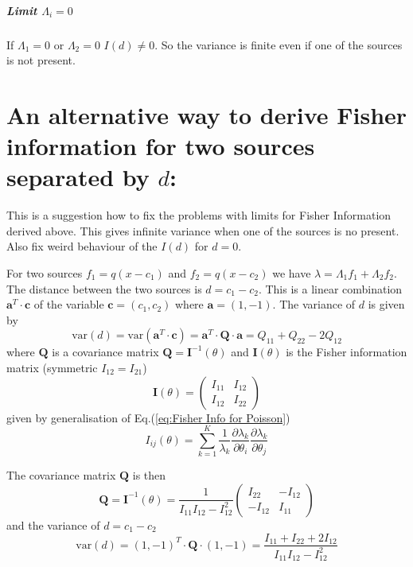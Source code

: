 \subparagraph{Limit $\Lambda_{i}=0$}

If $\Lambda_{1}=0$ or $\Lambda_{2}=0$ $I(d)\neq0$. So the variance is finite even if one of the sources is not present.


\section{An alternative way to derive Fisher information for two sources separated by $d$:\label{sub:Appendix An-alternative-way-Fisher-info}}

This is a suggestion how to fix the problems with limits for Fisher Information derived above. This gives infinite variance when one of the sources is no present. Also fix weird behaviour of the $I(d)$ for $d=0$. 

For two sources $f_{1}=q(x-c_{1})$ and $f_{2}=q(x-c_{2})$ we have $\lambda=\Lambda_{1}f_{1}+\Lambda_{2}f_{2}$. The distance between the two sources is $d=c_{1}-c_{2}$. This is a linear combination $\bm{a}^{T}\cdot\bm{c}$ of the variable $\bm{c}=(c_{1},c_{2})$ where $\bm{a}=(1,-1)$. The variance of $d$ is given by
%
\begin{equation}
	\textrm{var}(d)=\textrm{var}(\bm{a}^{T}\cdot\bm{c})=\bm{a}^{T}\cdot\bm{Q}\cdot\bm{a}=Q_{11}+Q_{22}-2Q_{12}
\end{equation}
%
where $\bm{Q}$ is a covariance matrix $\bm{Q}=\bm{I}^{-1}(\theta)$ and $\bm{I}(\theta)$ is the Fisher information matrix (symmetric
$I_{12}=I_{21}$) 
%
\begin{equation}
	\bm{I}(\theta)=\left(
	\begin{array}{cc}
		I_{11} & I_{12}\\
		I_{12} & I_{22}
	\end{array}\right)
\end{equation}
%
given by generalisation of Eq.(\ref{eq:Fisher Info for Poisson})
%
\begin{equation}
	I_{ij}(\theta)=\sum_{k=1}^{K}\frac{1}{\lambda_{k}}\frac{\partial\lambda_{k}}{\partial\theta_{i}}\frac{\partial\lambda_{k}}{\partial\theta_{j}}
\end{equation}

The covariance matrix $\bm{Q}$ is then 
%
\begin{equation}
	\bm{Q}=\bm{I}^{-1}(\theta)=\frac{1}{I_{11}I_{12}-I_{12}^{2}}\left(
	\begin{array}{cc}	
		I_{22} & -I_{12}\\
		-I_{12} & I_{11}
	\end{array}\right)
\end{equation}
%
and the variance of $d=c_{1}-c_{2}$ 
%
\begin{equation}
	\textrm{var}(d)=(1,-1)^{T}\cdot\bm{Q}\cdot(1,-1)=\frac{I_{11}+I_{22}+2I_{12}}{I_{11}I_{12}-I_{12}^{2}}
	\label{eq:variance alternative}
\end{equation}

